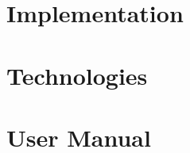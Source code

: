 \section{Implementation} \label{section:implementation}

\section{Technologies} \label{section:technologies}

\section{User Manual} \label{section:user-manual}
